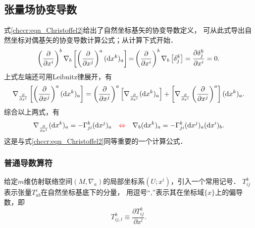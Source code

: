 \subsection{张量场协变导数}
式\eqref{chccr:eqn_Christoffel2}给出了自然坐标基矢的协变导数定义，
可从此式导出自然坐标对偶基矢的协变导数计算公式；从计算下式开始．
\begin{equation}
    \left(\frac{\partial }{\partial x^i}\right) ^b \nabla_b
    \left[\left(\frac{\partial }{\partial x^j}\right) ^a ({\rm d}x^k)_a \right]{=}
    \left(\frac{\partial }{\partial x^i}\right) ^b \nabla_b \left[\delta_j^k \right]
    = \frac{\partial \delta_j^k}{\partial x^i} =0.
\end{equation}
上式左端还可用Leibnitz律展开，有
\begin{equation*}
    \nabla_{\frac{\partial }{\partial x^i}}
    \left[\left(\frac{\partial }{\partial x^j}\right) ^a ({\rm d}x^k)_a \right]
   =\left(\frac{\partial }{\partial x^j}\right) ^a  \left[
    \nabla_{\frac{\partial }{\partial x^i}}  ({\rm d}x^k)_a \right]
    +\left[\nabla_{\frac{\partial }{\partial x^i}}
    \left(\frac{\partial }{\partial x^j}\right) ^a  \right]({\rm d}x^k)_a .
\end{equation*}
综合以上两式，有
\begin{equation}\label{chccr:eqn_Ddualbase}
    \nabla_{\frac{\partial }{\partial x^i}}  ({\rm d}x^k)_a = -  \Gamma_{ji}^k ({\rm d}x^j)_a
    {\quad \color{red}\Leftrightarrow \quad}
    \nabla_b  ({\rm d}x^k)_a = - \Gamma_{ji}^k ({\rm d}x^j)_a ({\rm d}x^i)_b.
\end{equation}
这是与式\eqref{chccr:eqn_Christoffel2}同等重要的一个计算公式．

\subsubsection{普通导数算符}
给定$m$维仿射联络空间$(M,\nabla_a)$的局部坐标系$(U;x^i)$，引入一个常用记号．
$T_{ij}^k$表示张量$T_{ab}^c$在自然坐标基底下的分量，
用逗号“,”表示其在坐标域$\{x\}$上的偏导数，即
\begin{equation}
    T^k_{ij,l} \equiv \frac{\partial T^k_{ij}}{\partial x^l} .
\end{equation}


